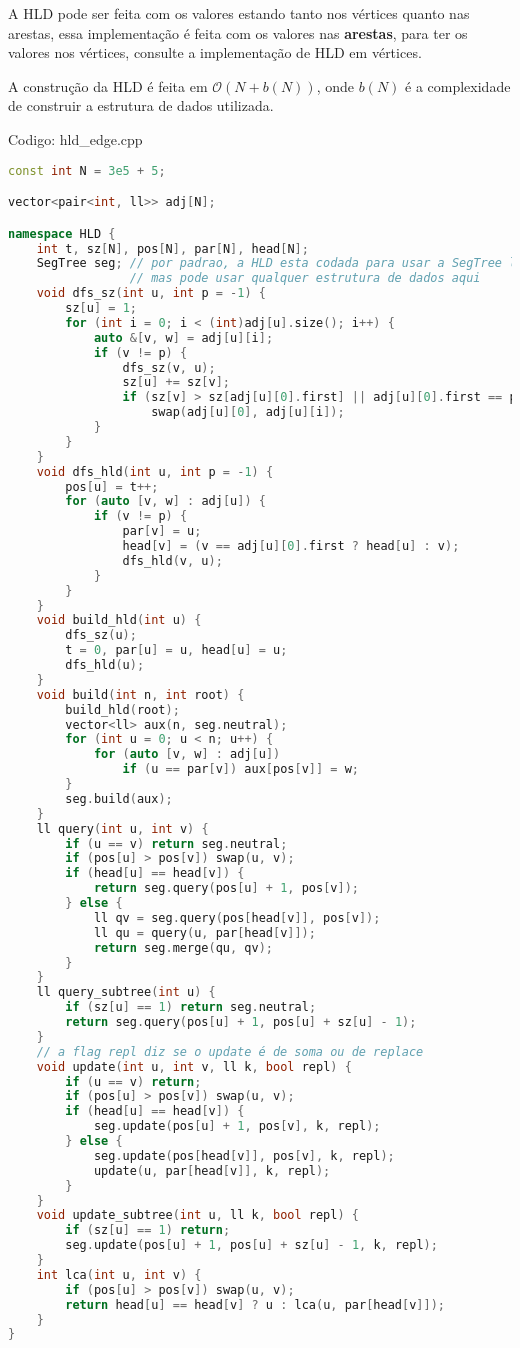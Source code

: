 \documentclass[10pt, a4paper, oneside]{book}
\begin{document}
A HLD pode ser feita com os valores estando tanto nos vértices quanto nas arestas, essa implementação é feita com os valores nas \textbf{arestas}, para ter os valores nos vértices, consulte a implementação de HLD em vértices.



A construção da HLD é feita em $\mathcal{O}(N + b(N))$, onde $b(N)$ é a complexidade de construir a estrutura de dados utilizada.
\hfill

Codigo: hld\_edge.cpp

\begin{lstlisting}[language=C++]
const int N = 3e5 + 5;

vector<pair<int, ll>> adj[N];

namespace HLD {
    int t, sz[N], pos[N], par[N], head[N];
    SegTree seg; // por padrao, a HLD esta codada para usar a SegTree lazy,
                 // mas pode usar qualquer estrutura de dados aqui
    void dfs_sz(int u, int p = -1) {
        sz[u] = 1;
        for (int i = 0; i < (int)adj[u].size(); i++) {
            auto &[v, w] = adj[u][i];
            if (v != p) {
                dfs_sz(v, u);
                sz[u] += sz[v];
                if (sz[v] > sz[adj[u][0].first] || adj[u][0].first == p)
                    swap(adj[u][0], adj[u][i]);
            }
        }
    }
    void dfs_hld(int u, int p = -1) {
        pos[u] = t++;
        for (auto [v, w] : adj[u]) {
            if (v != p) {
                par[v] = u;
                head[v] = (v == adj[u][0].first ? head[u] : v);
                dfs_hld(v, u);
            }
        }
    }
    void build_hld(int u) {
        dfs_sz(u);
        t = 0, par[u] = u, head[u] = u;
        dfs_hld(u);
    }
    void build(int n, int root) {
        build_hld(root);
        vector<ll> aux(n, seg.neutral);
        for (int u = 0; u < n; u++) {
            for (auto [v, w] : adj[u])
                if (u == par[v]) aux[pos[v]] = w;
        }
        seg.build(aux);
    }
    ll query(int u, int v) {
        if (u == v) return seg.neutral;
        if (pos[u] > pos[v]) swap(u, v);
        if (head[u] == head[v]) {
            return seg.query(pos[u] + 1, pos[v]);
        } else {
            ll qv = seg.query(pos[head[v]], pos[v]);
            ll qu = query(u, par[head[v]]);
            return seg.merge(qu, qv);
        }
    }
    ll query_subtree(int u) {
        if (sz[u] == 1) return seg.neutral;
        return seg.query(pos[u] + 1, pos[u] + sz[u] - 1);
    }
    // a flag repl diz se o update é de soma ou de replace
    void update(int u, int v, ll k, bool repl) {
        if (u == v) return;
        if (pos[u] > pos[v]) swap(u, v);
        if (head[u] == head[v]) {
            seg.update(pos[u] + 1, pos[v], k, repl);
        } else {
            seg.update(pos[head[v]], pos[v], k, repl);
            update(u, par[head[v]], k, repl);
        }
    }
    void update_subtree(int u, ll k, bool repl) {
        if (sz[u] == 1) return;
        seg.update(pos[u] + 1, pos[u] + sz[u] - 1, k, repl);
    }
    int lca(int u, int v) {
        if (pos[u] > pos[v]) swap(u, v);
        return head[u] == head[v] ? u : lca(u, par[head[v]]);
    }
}
\end{lstlisting}
\hfill
\end{document}
